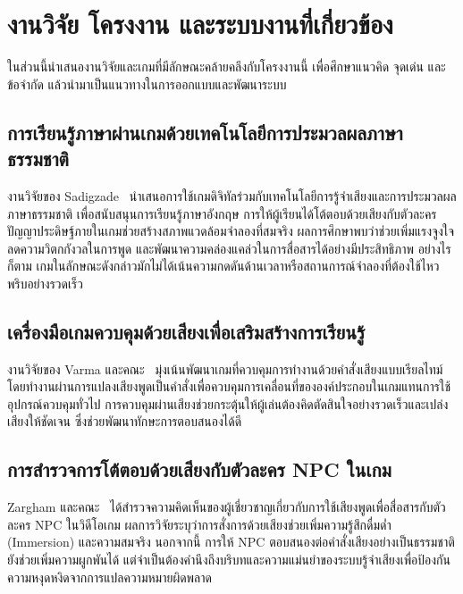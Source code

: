 
\section{งานวิจัย โครงงาน และระบบงานที่เกี่ยวข้อง}

ในส่วนนี้นำเสนองานวิจัยและเกมที่มีลักษณะคล้ายคลึงกับโครงงานนี้ เพื่อศึกษาแนวคิด จุดเด่น และข้อจำกัด แล้วนำมาเป็นแนวทางในการออกแบบและพัฒนาระบบ

\subsection{การเรียนรู้ภาษาผ่านเกมด้วยเทคโนโลยีการประมวลผลภาษาธรรมชาติ}

งานวิจัยของ Sadigzade~\cite{sadigzade2025} นำเสนอการใช้เกมดิจิทัลร่วมกับเทคโนโลยีการรู้จำเสียงและการประมวลผลภาษาธรรมชาติ เพื่อสนับสนุนการเรียนรู้ภาษาอังกฤษ การให้ผู้เรียนได้โต้ตอบด้วยเสียงกับตัวละครปัญญาประดิษฐ์ภายในเกมช่วยสร้างสภาพแวดล้อมจำลองที่สมจริง ผลการศึกษาพบว่าช่วยเพิ่มแรงจูงใจ ลดความวิตกกังวลในการพูด และพัฒนาความคล่องแคล่วในการสื่อสารได้อย่างมีประสิทธิภาพ อย่างไรก็ตาม เกมในลักษณะดังกล่าวมักไม่ได้เน้นความกดดันด้านเวลาหรือสถานการณ์จำลองที่ต้องใช้ไหวพริบอย่างรวดเร็ว

\subsection{เครื่องมือเกมควบคุมด้วยเสียงเพื่อเสริมสร้างการเรียนรู้}

งานวิจัยของ Varma และคณะ~\cite{varma2025} มุ่งเน้นพัฒนาเกมที่ควบคุมการทำงานด้วยคำสั่งเสียงแบบเรียลไทม์ โดยทำงานผ่านการแปลงเสียงพูดเป็นคำสั่งเพื่อควบคุมการเคลื่อนที่ขององค์ประกอบในเกมแทนการใช้อุปกรณ์ควบคุมทั่วไป การควบคุมผ่านเสียงช่วยกระตุ้นให้ผู้เล่นต้องคิดตัดสินใจอย่างรวดเร็วและเปล่งเสียงให้ชัดเจน ซึ่งช่วยพัฒนาทักษะการตอบสนองได้ดี

\subsection{การสำรวจการโต้ตอบด้วยเสียงกับตัวละคร NPC ในเกม}

Zargham และคณะ~\cite{zargham2024} ได้สำรวจความคิดเห็นของผู้เชี่ยวชาญเกี่ยวกับการใช้เสียงพูดเพื่อสื่อสารกับตัวละคร NPC ในวิดีโอเกม ผลการวิจัยระบุว่าการสั่งการด้วยเสียงช่วยเพิ่มความรู้สึกดื่มด่ำ (Immersion) และความสมจริง นอกจากนี้ การให้ NPC ตอบสนองต่อคำสั่งเสียงอย่างเป็นธรรมชาติยังช่วยเพิ่มความผูกพันได้ แต่จำเป็นต้องคำนึงถึงบริบทและความแม่นยำของระบบรู้จำเสียงเพื่อป้องกันความหงุดหงิดจากการแปลความหมายผิดพลาด

